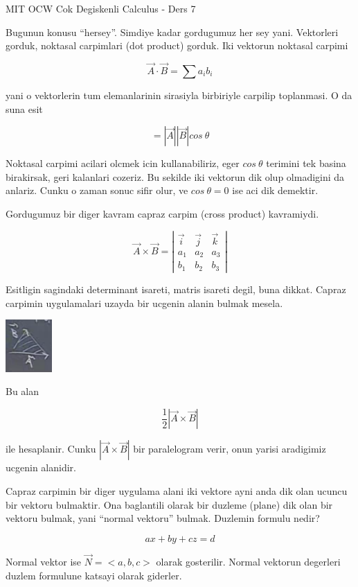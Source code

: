 \documentclass[12pt,fleqn]{article}
\begin{document}
MIT OCW Cok Degiskenli Calculus - Ders 7

Bugunun konusu ``hersey''. Simdiye kadar gordugumuz her sey
yani. Vektorleri gorduk, noktasal carpimlari (dot product) gorduk. Iki
vektorun noktasal carpimi

\[ \vec{A} \cdot \vec{B} = \sum a_ib_i\]

yani o vektorlerin tum elemanlarinin sirasiyla birbiriyle carpilip
toplanmasi. O da suna esit

\[ = |\vec{A}||\vec{B}|cos \ \theta \]

Noktasal carpimi acilari olcmek icin kullanabiliriz, eger $cos \ \theta$
terimini tek basina birakirsak, geri kalanlari cozeriz. Bu sekilde iki
vektorun dik olup olmadigini da anlariz. Cunku o zaman sonuc sifir olur, ve
$cos \ \theta = 0$ ise aci dik demektir. 

Gordugumuz bir diger kavram capraz carpim (cross product) kavramiydi. 

\[ \vec{A} \times \vec{B} = 
\left|\begin{array}{rrr}
\vec{i} & \vec{j} & \vec{k}  \\
a_1 & a_2 & a_3 \\
b_1 & b_2 & b_3 
\end{array}\right|
\]

Esitligin sagindaki determinant isareti, matris isareti degil, buna
dikkat. Capraz carpimin uygulamalari uzayda bir ucgenin alanin bulmak
mesela. 

\includegraphics[height=2cm]{7_1.png}

Bu alan

\[ \frac{1}{2}|\vec{A} \times \vec{B}| \]

ile hesaplanir. Cunku $|\vec{A} \times \vec{B}|$ bir paralelogram verir, onun yarisi 
aradigimiz ucgenin alanidir.

Capraz carpimin bir diger uygulama alani iki vektore ayni anda dik olan
ucuncu bir vektoru bulmaktir. Ona baglantili olarak bir duzleme (plane) dik
olan bir vektoru bulmak, yani ``normal vektoru'' bulmak. Duzlemin formulu
nedir? 

\[ ax + by + cz  = d \]

Normal vektor ise $\vec{N} = <a,b,c>$ olarak gosterilir. Normal vektorun
degerleri duzlem formulune katsayi olarak giderler. 
\end{document}
